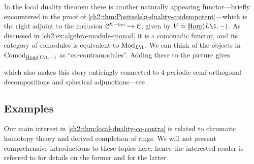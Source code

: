\begin{remark}
    In the local duality theorem there is another naturally appearing functor---briefly encountered in the proof of \cref{ch2:thm:Positselski-duality-coidempotent}---which is the right adjoint to the inclusion $\EuScript{C}^{\mathcal{K}-\mathrm{loc}}\hookrightarrow \EuScript{C}$, given by $V \simeq \iHom(L\1, -)$. As discussed in \cref{ch2:ex:algebra-module-monad} it is a comonadic functor, and its category of comodules is equivalent to $\Mod_{L\1}$. We can think of the objects in $\Comod_{\iHom(L\1,-)}$ as ``co-contramodules''. Adding these to the picture gives 
    \begin{center}
    \end{center}
    which also makes this story enticingly connected to $4$-periodic semi-orthogonal decompositions and spherical adjunctions---see \cite[Section 2.5]{dyckerhoff-kaparanov-schechtman-soibelman_2024}. 
\end{remark}



\subsection{Examples}

Our main interest in \cref{ch2:thm:local-duality-co-contra} is related to chromatic homotopy theory and derived completion of rings. We will not present comprehensive introductions to these topics here, hence the interested reader is referred to \cite{barthel-beaudry_19} for details on the former and \cite{barthel-heard-valenzuela_2020} for the latter.

